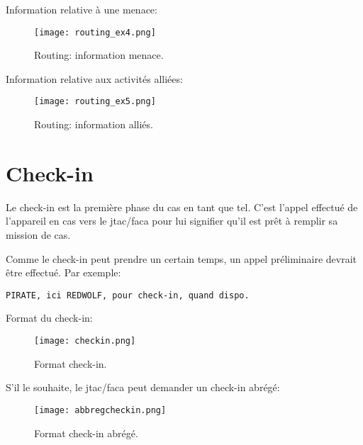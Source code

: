         \item Information relative à une menace:\\
        \begin{figure}[H]
            \texttt{[image: routing\_ex4.png]}
            \caption{Routing: information menace.}
            \label{fig:routingthreat}
        \end{figure}
        \item Information relative aux activités alliées:\\
        \begin{figure}[H]
            \texttt{[image: routing\_ex5.png]}
            \caption{Routing: information alliés.}
            \label{fig:routingallies}
        \end{figure}
    \ed
\ed

\section{Check-in}

\e
	\begin{minipage}{\linewidth}
    \item
    Le check-in est la première phase du \acrshort{cas} en tant que tel. C’est l’appel effectué de l’appareil en \acrshort{cas} vers le \acrshort{jtac}/\acrshort{faca} pour lui signifier qu’il est prêt à remplir sa mission de \acrshort{cas}.
    \item Comme le check-in peut prendre un certain temps, un appel préliminaire devrait être effectué. Par exemple:
	\begin{lstlisting}[caption=Appel préliminaire, label=preliminary_call]
    PIRATE, ici REDWOLF, pour check-in, quand dispo.
	\end{lstlisting}
	\end{minipage}

	\begin{minipage}{\linewidth}
    \item Format du check-in:
    \begin{figure}[H]
        \texttt{[image: checkin.png]}
        \caption{Format check-in.}
        \label{fig:checkin}
    \end{figure}    
    \end{minipage}
    
    \begin{minipage}{\linewidth}
    \item S'il le souhaite, le \gls{jtac}/\gls{faca} peut demander un check-in abrégé:
    \begin{figure}[H]
        \texttt{[image: abbregcheckin.png]}
        \caption{Format check-in abrégé.}
        \label{fig:abbregcheckin}
    \end{figure}
    \end{minipage}
    
